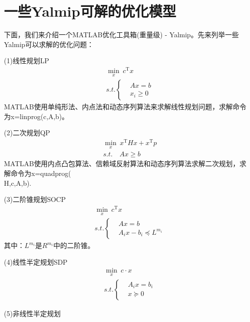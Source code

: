     \section{一些Yalmip可解的优化模型}
        \par
        下面，我们来介绍一个MATLAB优化工具箱(重量级) - Yalmip。先来列举一些Yalmip可以求解的优化问题：
        \par
        (1)线性规划LP
        \begin{align*}
        &\min_x \ c^\mathrm{T}x\\
        &s.t.\left\{
        \begin{aligned}
        &Ax = b\\
        &x_i \geqslant 0
        \end{aligned}
        \right.
        \end{align*}
        MATLAB使用单纯形法、内点法和动态序列算法来求解线性规划问题，求解命令为x=linprog(c,A,b)。
        \par
        (2)二次规划QP
        \begin{align*}
        &\min_x \ x^\mathrm{T} Hx + x^\mathrm{T}p\\
        &s.t.\quad Ax \geqslant b
        \end{align*}
        MATLAB使用内点凸包算法、信赖域反射算法和动态序列算法求解二次规划，求解命令为x=quadprog(\\H,c,A,b).
        \par
        (3)二阶锥规划SOCP
        \begin{align*}
        &\min_x \ c^\mathrm{T}x\\
        &s.t.\left\{
        \begin{aligned}
        &Ax = b\\
        &A_ix - b_i \preceq L^{m_i}
        \end{aligned}
        \right.
        \end{align*}
        其中：$L^{m_i}$是$R^{m_i}$中的二阶锥。
        \par
        (4)线性半定规划SDP
        \begin{align*}
        &\min_x \ c \cdot x\\
        &s.t.\left\{
        \begin{aligned}
        &A_ix = b_i\\
        &x \succeq 0
        \end{aligned}
        \right.
        \end{align*}
        \par
        (5)非线性半定规划
